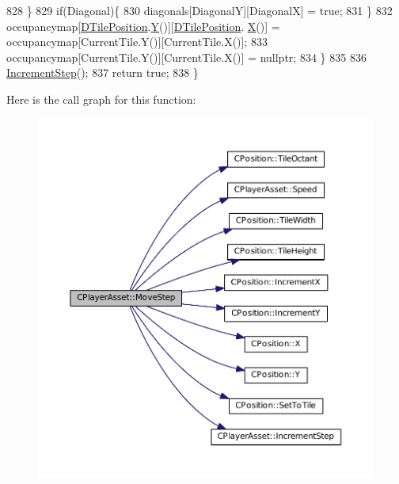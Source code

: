 \begin{DoxyCode}
828         \}
829         \textcolor{keywordflow}{if}(Diagonal)\{
830             diagonals[DiagonalY][DiagonalX] = \textcolor{keyword}{true};
831         \}
832         occupancymap[\hyperlink{classCPlayerAsset_a5b59a9d3b7db8c7fa194b80dafb96186}{DTilePosition}.\hyperlink{classCPosition_a1aa8a30e2f08dda1f797736ba8c13a87}{Y}()][\hyperlink{classCPlayerAsset_a5b59a9d3b7db8c7fa194b80dafb96186}{DTilePosition}.
      \hyperlink{classCPosition_a9a6b94d3b91df1492d166d9964c865fc}{X}()] = occupancymap[CurrentTile.Y()][CurrentTile.X()];
833         occupancymap[CurrentTile.Y()][CurrentTile.X()] = \textcolor{keyword}{nullptr};
834     \}
835     
836     \hyperlink{classCPlayerAsset_aa1d39b408fd5aa11f2c3a19ef4d3895d}{IncrementStep}();
837     \textcolor{keywordflow}{return} \textcolor{keyword}{true};
838 \}
\end{DoxyCode}
Here is the call graph for this function\+:
\nopagebreak
\begin{figure}[H]
\begin{center}
\leavevmode
\includegraphics[width=350pt]{classCPlayerAsset_a4c8ef6c0049b48045c2ba95d398dbc05_cgraph}
\end{center}
\end{figure}
\hypertarget{classCPlayerAsset_aa7723b668d4278f23eb28ca8b6043192}{}\label{classCPlayerAsset_aa7723b668d4278f23eb28ca8b6043192} 
